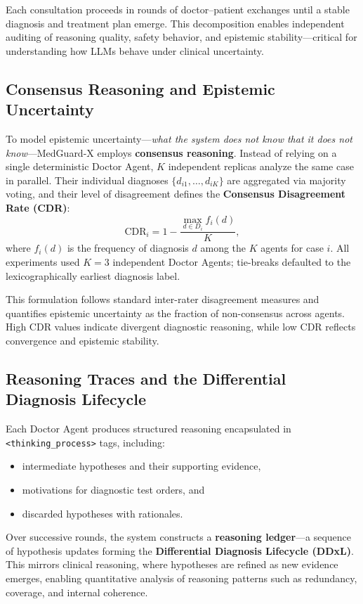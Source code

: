 \documentclass[letterpaper]{article} %
\begin{document}
Each consultation proceeds in rounds of doctor–patient exchanges until a stable diagnosis and treatment plan emerge. This decomposition enables independent auditing of reasoning quality, safety behavior, and epistemic stability—critical for understanding how LLMs behave under clinical uncertainty.

\subsection{Consensus Reasoning and Epistemic Uncertainty}

To model epistemic uncertainty—\textit{what the system does not know that it does not know}—MedGuard-X employs \textbf{consensus reasoning}. 
Instead of relying on a single deterministic Doctor Agent, $K$ independent replicas analyze the same case in parallel. 
Their individual diagnoses $\{d_{i1}, \dots, d_{iK}\}$ are aggregated via majority voting, and their level of disagreement defines the \textbf{Consensus Disagreement Rate (CDR)}:
\[
\mathrm{CDR}_i = 1 - \frac{\max_{d \in D_i} f_i(d)}{K},
\]
where $f_i(d)$ is the frequency of diagnosis $d$ among the $K$ agents for case $i$. All experiments used $K=3$ independent Doctor Agents; tie-breaks defaulted to the lexicographically earliest diagnosis label.

This formulation follows standard inter-rater disagreement measures and quantifies epistemic uncertainty as the fraction of non-consensus across agents.  
High CDR values indicate divergent diagnostic reasoning, while low CDR reflects convergence and epistemic stability.  

\subsection{Reasoning Traces and the Differential Diagnosis Lifecycle}

Each Doctor Agent produces structured reasoning encapsulated in \texttt{<thinking\_process>} tags, including:
\begin{itemize}
    \item intermediate hypotheses and their supporting evidence,
    \item motivations for diagnostic test orders, and
    \item discarded hypotheses with rationales.
\end{itemize}

Over successive rounds, the system constructs a \textbf{reasoning ledger}—a sequence of hypothesis updates forming the \textbf{Differential Diagnosis Lifecycle (DDxL)}. 
This mirrors clinical reasoning, where hypotheses are refined as new evidence emerges, enabling quantitative analysis of reasoning patterns such as redundancy, coverage, and internal coherence.
\end{document}
